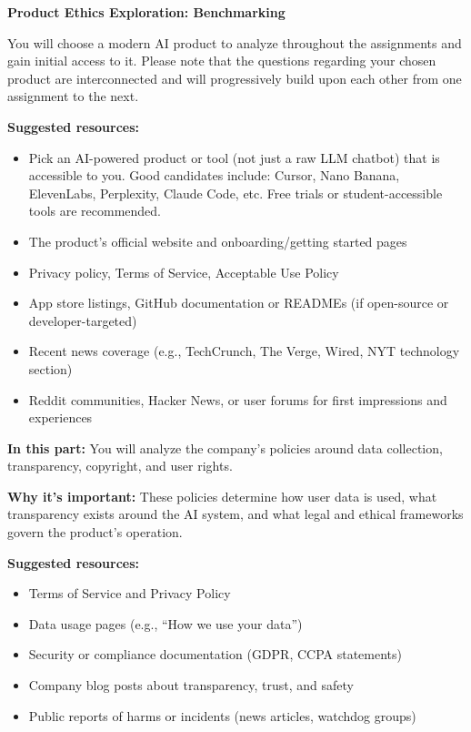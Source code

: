 \item {\bf Product Ethics Exploration: Benchmarking}

You will choose a modern AI product to analyze throughout the assignments and gain initial access to it. Please note that the questions regarding your chosen product are interconnected and will progressively build upon each other from one assignment to the next.

\textbf{Suggested resources:}
\begin{itemize}
    \item Pick an AI-powered product or tool (not just a raw LLM chatbot) that is accessible to you. Good candidates include: Cursor, Nano Banana, ElevenLabs, Perplexity, Claude Code, etc. Free trials or student-accessible tools are recommended.
    \item The product's official website and onboarding/getting started pages
    \item Privacy policy, Terms of Service, Acceptable Use Policy
    \item App store listings, GitHub documentation or READMEs (if open-source or developer-targeted)
    \item Recent news coverage (e.g., TechCrunch, The Verge, Wired, NYT technology section)
    \item Reddit communities, Hacker News, or user forums for first impressions and experiences
\end{itemize}

\textbf{In this part:} You will analyze the company's policies around data collection, transparency, copyright, and user rights.

\vspace{2mm}

\textbf{Why it's important:} These policies determine how user data is used, what transparency exists around the AI system, and what legal and ethical frameworks govern the product's operation.

\vspace{2mm}

\textbf{Suggested resources:}
\begin{itemize}
  \item Terms of Service and Privacy Policy
  \item Data usage pages (e.g., ``How we use your data'')
  \item Security or compliance documentation (GDPR, CCPA statements)
  \item Company blog posts about transparency, trust, and safety
  \item Public reports of harms or incidents (news articles, watchdog groups)
\end{itemize}

\begin{enumerate}
    
    
    
    
    
\end{enumerate}